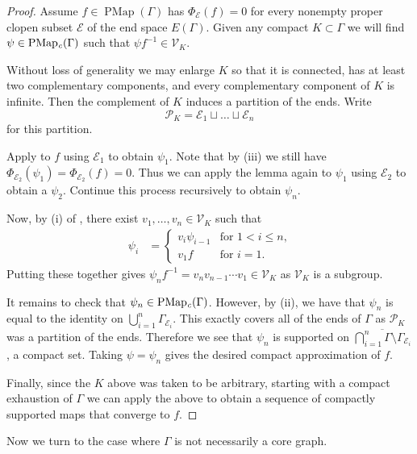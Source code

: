 \documentclass[11pt]{amsart}
\theoremstyle{plain}
\theoremstyle{definition}
\DeclareMathOperator{\PMap}{PMap}
\DeclareMathOperator{\PMapc}{PMap_{\it c}}
\newcommand{\cE}{\mathcal{E}}
\newcommand{\cV}{\mathcal{V}}
\newcommand{\cP}{\mathcal{P}}
\def\G{{\Gamma}}
\newcommand{\<}{\langle}
\renewcommand{\>}{\rangle}
\begin{document}
\begin{proof}
    Assume $f \in \PMap(\G)$ has $\Phi_{\cE}(f) = 0$ for every nonempty proper clopen subset $\cE$ of the end space $E(\G)$. Given any compact $K \subset \G$ we will find $\psi \in \PMapc(\G)$ such that $\psi f^{-1} \in \cV_{K}$. 

    Without loss of generality we may enlarge $K$ so that it is connected, has at least two complementary components, and every complementary component of $K$ is infinite. Then the complement of $K$ induces a partition of the ends. Write 
    \[
    \cP_K = \cE_1 \sqcup \ldots \sqcup \cE_n
    \]
    for this partition.

    Apply  to $f$ using $\cE_{1}$ to obtain $\psi_{1}$. Note that by (iii) we still have $\Phi_{\cE_{2}}(\psi_{1}) = \Phi_{\cE_2}(f) = 0$. Thus we can apply the lemma again to $\psi_{1}$ using $\cE_{2}$ to obtain a $\psi_{2}$. Continue this process recursively to obtain $\psi_{n}$. 

    Now, by (i) of , there exist $v_1,\ldots,v_n \in \cV_K$ such that
    \begin{align*}
        \psi_{i} &=
        \begin{cases}
            v_i\psi_{i-1} & \text{for $1 < i \le n$,}\\
            v_1f & \text{for $i=1$}.
        \end{cases}
    \end{align*}
    Putting these together gives $\psi_{n}f^{-1} = v_{n}v_{n-1}\cdots v_{1} \in \cV_{K}$ as $\cV_{K}$ is a subgroup.

    It remains to check that $\psi_{n} \in \PMapc(\G)$. However, by (ii), we have that $\psi_{n}$ is equal to the identity on $\bigcup_{i=1}^{n}\G_{\cE_{i}}$. This exactly covers all of the ends of $\G$ as $\cP_{K}$ was a partition of the ends. Therefore we see that $\psi_{n}$ is supported on $\overline{\bigcap_{i=1}^{n} \G \setminus \G_{\cE_{i}}}$, a compact set. Taking $\psi = \psi_{n}$ gives the desired compact approximation of $f$. 

    Finally, since the $K$ above was taken to be arbitrary, starting with a compact exhaustion of $\G$ we can apply the above to obtain a sequence of compactly supported maps that converge to $f$. 
\end{proof}

Now we turn to the case where $\G$ is not necessarily a core graph. 
\end{document}
